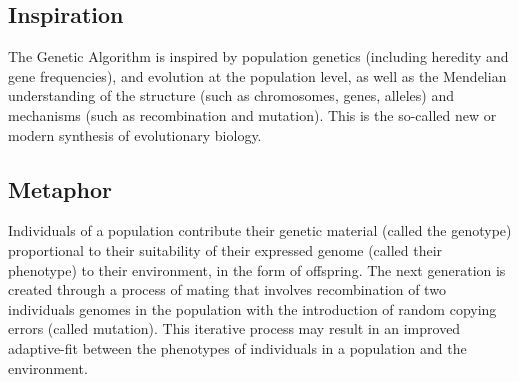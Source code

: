 \subsection{Inspiration}
The Genetic Algorithm is inspired by population genetics (including heredity and gene frequencies), and evolution at the population level, as well as the Mendelian understanding of the structure (such as chromosomes, genes, alleles) and mechanisms (such as recombination and mutation). This is the so-called new or modern synthesis of evolutionary biology. 

\subsection{Metaphor}
Individuals of a population contribute their genetic material (called the genotype) proportional to their suitability of their expressed genome (called their phenotype) to their environment, in the form of offspring. The next generation is created through a process of mating that involves recombination of two individuals genomes in the population with the introduction of random copying errors (called mutation). This iterative process may result in an improved adaptive-fit between the phenotypes of individuals in a population and the environment.

